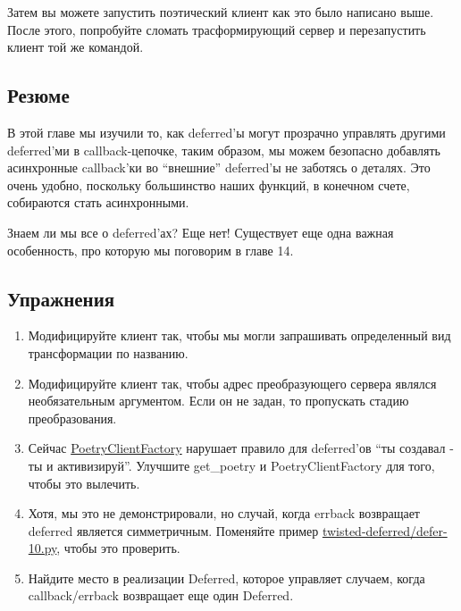 
Затем вы можете запустить поэтический клиент как это было 
написано выше. После этого, попробуйте сломать трасформирующий сервер и 
перезапустить клиент той же командой.


\subsection{Резюме}


В этой главе мы изучили то, как deferred'ы могут 
прозрачно управлять другими deferred'ми в callback-цепочке, 
таким образом, мы можем безопасно добавлять асинхронные 
callback'ки во ``внешние'' deferred'ы не заботясь о деталях. 
Это очень удобно, поскольку большинство наших функций, 
в конечном счете, собираются стать асинхронными. 


Знаем ли мы все о deferred'ах? Еще нет! Существует еще 
одна важная особенность, про которую мы поговорим в главе 14.


\subsection{Упражнения}

\begin{enumerate}

\item Модифицируйте клиент так, чтобы мы могли запрашивать определенный 
вид трансформации по названию.

\item Модифицируйте клиент так, чтобы адрес преобразующего сервера 
являлся необязательным аргументом. Если он не задан, то пропускать стадию 
преобразования.

\item Сейчас \href{http://github.com/jdavisp3/twisted-intro/blob/master/twisted-client-6/get-poetry.py#L67}{PoetryClientFactory} 
нарушает правило для deferred'ов  
``ты создавал - ты и активизируй''. Улучшите get\_poetry и 
PoetryClientFactory для того, чтобы это вылечить.

\item Хотя, мы это не демонстрировали, но случай, когда errback возвращает 
deferred является симметричным. Поменяйте пример 
\href{http://github.com/jdavisp3/twisted-intro/blob/master/twisted-deferred/defer-10.py#L1}{twisted-deferred/defer-10.py}, чтобы это проверить.

\item Найдите место в реализации Deferred, которое управляет 
случаем, когда callback/errback возвращает еще один Deferred.

\end{enumerate}


